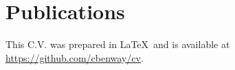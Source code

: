 \documentclass[letterpaper, 10pt]{article}
\begin{document}

\section*{Publications}
\begingroup
   \renewcommand{\section}[2]{}
   
   \nocite{*}
   
\endgroup

\vfill

\footnotesize
This C.V. was prepared in \LaTeX\ and is available at \href{https://github.com/cbenway/cv}{https://github.com/cbenway/cv}.
\end{document}
